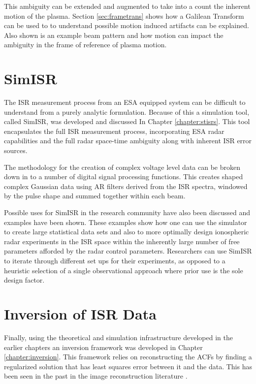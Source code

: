 This ambiguity can be extended and augmented to take into a count the inherent motion of the plasma. Section \ref{sec:frametrans} shows how a Galilean Transform can be used to to understand possible motion induced artifacts can be explained. Also shown is an example beam pattern and how motion can impact the ambiguity in the frame of reference of plasma motion.

\section{SimISR}


The ISR measurement process from an ESA equipped system can be difficult to understand from a purely analytic formulation. Because of this a simulation tool, called SimISR, was developed and discussed In Chapter \ref{chapter:stisrs}. This tool encapsulates the full ISR measurement process, incorporating ESA radar capabilities and the full radar space-time ambiguity along with inherent ISR error sources. 

The methodology for the creation of complex voltage level data can be broken down in to a number of digital signal processing functions. This creates shaped complex Gaussian data using AR filters derived from the ISR spectra, windowed by the pulse shape and summed together within each beam.  

Possible uses for SimISR in the research community have also been discussed and examples have been shown. These examples show how one can use the simulator to create large statistical data sets and also to more optimally design ionospheric radar experiments in the ISR space within the inherently large number of free parameters afforded by the radar control parameters. Researchers can use SimISR to iterate through different set ups for their experiments, as opposed to a heuristic selection of a single observational approach where prior use is the sole design factor. 
 
\section{Inversion of ISR Data}


Finally, using the theoretical and simulation infrastructure developed in the earlier chapters an inversion framework was developed in Chapter \ref{chapter:inversion}. This framework relies on reconstructing the ACFs by finding a regularized solution that has least squares error between it and the data. This has been seen in the past in the image reconstruction literature \cite{Karl:2005jy}.

